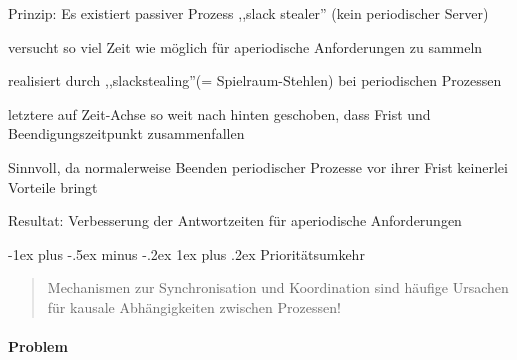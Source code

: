 \documentclass[a4paper]{article}
\makeatletter
\renewcommand{\subsubsection}{\@startsection{subsubsection}{3}{0mm}%
 {-1ex plus -.5ex minus -.2ex}%
 {1ex plus .2ex}%
 {\normalfont\small\bfseries}}
\makeatother
\begin{document}
\begin{multicols}{3}
    \begin{itemize*}
        \item Prinzip: Es existiert passiver Prozess ,,slack stealer'' (kein
        periodischer Server)
        \item versucht so viel Zeit wie möglich für aperiodische Anforderungen zu
        sammeln
        \item realisiert durch ,,slackstealing''(= Spielraum-Stehlen) bei
        periodischen Prozessen
        \item letztere auf Zeit-Achse so weit nach hinten geschoben, dass Frist und
        Beendigungszeitpunkt zusammenfallen
        \item Sinnvoll, da normalerweise Beenden periodischer Prozesse vor ihrer
        Frist keinerlei Vorteile bringt
        \item Resultat: Verbesserung der Antwortzeiten für aperiodische
        Anforderungen
    \end{itemize*}


    \subsubsection{Prioritätsumkehr}

    \begin{quote}
        Mechanismen zur Synchronisation und Koordination sind häufige Ursachen
        für kausale Abhängigkeiten zwischen Prozessen!
    \end{quote}


    \paragraph{Problem}


\end{multicols}
\end{document}
